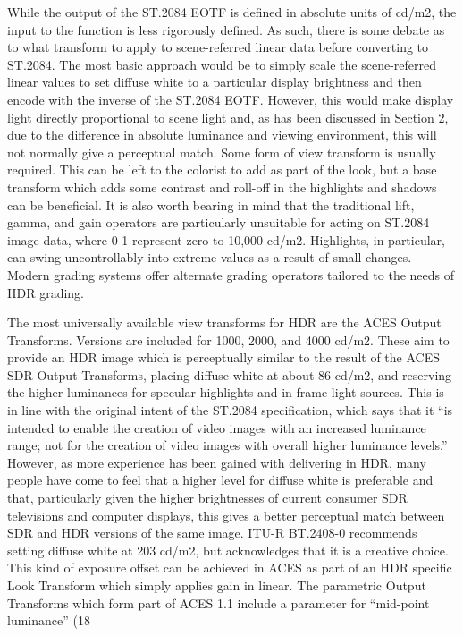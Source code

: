 While the output of the ST.2084 EOTF is defined in absolute units of cd/m2, the input to the function is less rigorously defined. As such, there is some debate as to what transform to apply to scene-referred linear data before converting to ST.2084. The most basic approach would be to simply scale the scene-referred linear values to set diffuse white to a particular display brightness and then encode with the inverse of the ST.2084 EOTF. However, this would make display light directly proportional to scene light and, as has been discussed in Section 2, due to the difference in absolute luminance and viewing environment, this will not normally give a perceptual match. Some form of view transform is usually required. This can be left to the colorist to add as part of the look, but a base transform which adds some contrast and roll-off in the highlights and shadows can be beneficial. It is also worth bearing in mind that the traditional lift, gamma, and gain operators are particularly unsuitable for acting on ST.2084 image data, where 0-1 represent zero to 10,000 cd/m2. Highlights, in particular, can swing uncontrollably into extreme values as a result of small changes. Modern grading systems offer alternate grading operators tailored to the needs of HDR grading.

The most universally available view transforms for HDR are the ACES Output Transforms. Versions are included for 1000, 2000, and 4000 cd/m2. These aim to provide an HDR image which is perceptually similar to the result of the ACES SDR Output Transforms, placing diffuse white at about 86 cd/m2, and reserving the higher luminances for specular highlights and in-frame light sources. This is in line with the original intent of the ST.2084 specification, which says that it “is intended to enable the creation of video images with an increased luminance range; not for the creation of video images with overall higher luminance levels.” However, as more experience has been gained with delivering in HDR, many people have come to feel that a higher level for diffuse white is preferable and that, particularly given the higher brightnesses of current consumer SDR televisions and computer displays, this gives a better perceptual match between SDR and HDR versions of the same image. ITU-R BT.2408-0 recommends setting diffuse white at 203 cd/m2, but acknowledges that it is a creative choice. This kind of exposure offset can be achieved in ACES as part of an HDR specific Look Transform which simply applies gain in linear. The parametric Output Transforms which form part of ACES 1.1 include a parameter for “mid-point luminance” (18%

